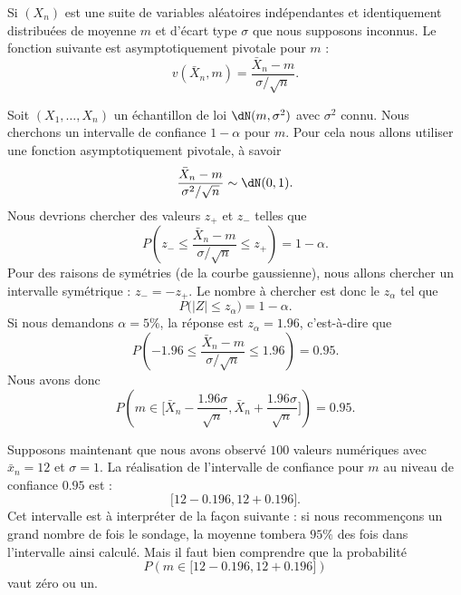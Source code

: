 \begin{example}
	Si \( (X_n)\) est une suite de variables aléatoires indépendantes et identiquement distribuées de moyenne \( m\) et d'écart type \( \sigma\) que nous supposons inconnus. Le fonction suivante est asymptotiquement pivotale pour \( m\) :
	\begin{equation}
		v(\bar X_n,m)=\frac{ \bar X_n-m }{ \sigma/\sqrt{n} }.
	\end{equation}
\end{example}

Soit \( (X_1,\ldots,X_n)\) un échantillon de loi \( \dN(m,\sigma^2)\) avec \( \sigma^2\) connu. Nous cherchons un intervalle de confiance \( 1-\alpha\) pour \( m\). Pour cela nous allons utiliser une fonction asymptotiquement pivotale, à savoir
\begin{equation}
	\frac{ \bar X_n-m }{ \sigma^2/\sqrt{n} }\sim\dN(0,1).
\end{equation}
Nous devrions chercher des valeurs \( z_+\) et \( z_-\) telles que
\begin{equation}
	P\left( z_-\leq \frac{ \bar X_n-m }{ \sigma/\sqrt{n} }\leq z_+ \right)=1-\alpha.
\end{equation}
Pour des raisons de symétries (de la courbe gaussienne), nous allons chercher un intervalle symétrique : \( z_-=-z_+\). Le nombre à chercher est donc le \( z_{\alpha}\) tel que
\begin{equation}
	P\big( | Z |\leq z_{\alpha} \big)=1-\alpha.
\end{equation}
Si nous demandons \( \alpha=5\%\), la réponse est \( z_{\alpha}=1.96\), c'est-à-dire que
\begin{equation}
	P\left( -1.96\leq \frac{ \bar X_n-m }{ \sigma/\sqrt{n} }\leq 1.96 \right)=0.95.
\end{equation}
Nous avons donc
\begin{equation}
	P\left( m\in\big[ \bar X_n-\frac{ 1.96\sigma }{ \sqrt{n} },\bar X_n+\frac{ 1.96\sigma }{ \sqrt{n} } \big] \right)=0.95.
\end{equation}

Supposons maintenant que nous avons observé \( 100\) valeurs numériques avec \( \bar x_n=12\) et \( \sigma=1\). La réalisation de l'intervalle de confiance pour \( m\) au niveau de confiance \( 0.95\) est :
\begin{equation}
	\big[ 12-0.196,12+0.196 \big].
\end{equation}
Cet intervalle est à interpréter de la façon suivante : si nous recommençons un grand nombre de fois le sondage, la moyenne tombera \( 95\%\) des fois dans l'intervalle ainsi calculé. Mais il faut bien comprendre que la probabilité
\begin{equation}
	P\left( m\in\big[ 12-0.196,12+0.196 \big] \right)
\end{equation}
vaut zéro ou un.


